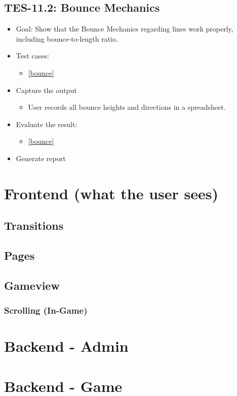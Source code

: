 \subsection{TES-11.2: Bounce Mechanics }
\begin{itemize}
\item Goal: Show that the Bounce Mechanics regarding lines work properly, including
bounce-to-length ratio. 
\item Test cases: 

\begin{itemize}
\item \ref{bounce}
\end{itemize}
\item Capture the output
\begin{itemize}
\item User records all bounce heights and directions in a spreadsheet.
\end{itemize}
\item Evaluate the result: 
\begin{itemize}
\item \ref{bounce}
\end{itemize}
\item Generate report 
\end{itemize}


\section{Frontend (what the user sees)}
\subsection{Transitions}
\subsection{Pages}
\subsection{Gameview}
\subsubsection{Scrolling (In-Game)}
\section{Backend - Admin}
\section{Backend - Game}
